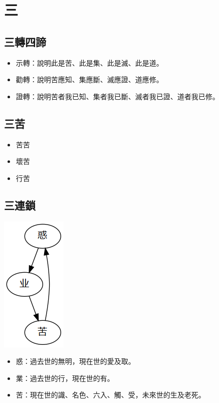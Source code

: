 \section{三}

\subsection{三轉四諦}
\begin{itemize}
  \item 示轉：說明此是苦、此是集、此是滅、此是道。
  \item 勸轉：說明苦應知、集應斷、滅應證、道應修。
  \item 證轉：說明苦者我已知、集者我已斷、滅者我已證、道者我已修。
\end{itemize}

\subsection{三苦}
\begin{itemize}
  \item 苦苦
  \item 壞苦
  \item 行苦
\end{itemize}

\subsection{三連鎖}
\includegraphics{释家/images/三连锁.png}
\begin{itemize}
  \item 惑：過去世的無明，現在世的愛及取。
  \item 業：過去世的行，現在世的有。
  \item 苦：現在世的識、名色、六入、觸、受，未來世的生及老死。
\end{itemize}
